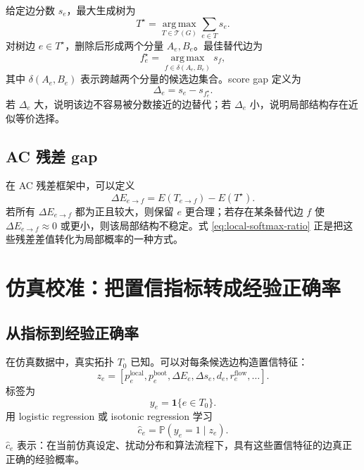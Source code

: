 \documentclass[UTF8,12pt,openany]{ctexrep}
\numberwithin{equation}{chapter}
\theoremstyle{definition}
\theoremstyle{plain}
\newcommand{\Prob}{\mathbb{P}}
\newcommand{\argmax}{\operatorname*{arg\,max}}
\newcommand{\ind}[1]{\mathbf{1}\{#1\}}
\newcommand{\Tcal}{\mathcal{T}}
\begin{document}
给定边分数 $s_e$，最大生成树为
\begin{equation}
T^\star=\argmax_{T\in\Tcal(G)}\sum_{e\in T}s_e.
\label{eq:maximum-spanning-tree}
\end{equation}
对树边 $e\in T^\star$，删除后形成两个分量 $A_e,B_e$。最佳替代边为
\begin{equation}
f_e^\star
=
\argmax_{f\in\delta(A_e,B_e)}s_f,
\label{eq:best-replacement-edge}
\end{equation}
其中 $\delta(A_e,B_e)$ 表示跨越两个分量的候选边集合。score gap 定义为
\begin{equation}
\Delta_e=s_e-s_{f_e^\star}.
\label{eq:score-gap}
\end{equation}
若 $\Delta_e$ 大，说明该边不容易被分数接近的边替代；若 $\Delta_e$ 小，说明局部结构存在近似等价选择。

\section{AC 残差 gap}

在 AC 残差框架中，可以定义
\begin{equation}
\Delta E_{e\to f}
=
E(T_{e\to f})-E(T^\star).
\label{eq:ac-gap}
\end{equation}
若所有 $\Delta E_{e\to f}$ 都为正且较大，则保留 $e$ 更合理；若存在某条替代边 $f$ 使 $\Delta E_{e\to f}\approx 0$ 或更小，则该局部结构不稳定。式 \eqref{eq:local-softmax-ratio} 正是把这些残差差值转化为局部概率的一种方式。

\chapter{仿真校准：把置信指标转成经验正确率}

\section{从指标到经验正确率}

在仿真数据中，真实拓扑 $T_0$ 已知。可以对每条候选边构造置信特征：
\begin{equation}
z_e=
\left[
p_e^{\mathrm{local}},
p_e^{\mathrm{boot}},
\Delta E_e,
\Delta s_e,
d_e,
r_e^{\mathrm{flow}},
\ldots
\right].
\label{eq:calibration-features}
\end{equation}
标签为
\begin{equation}
y_e=\ind{e\in T_0}.
\label{eq:calibration-label}
\end{equation}
用 logistic regression 或 isotonic regression 学习
\begin{equation}
\hat c_e=\Prob(y_e=1\mid z_e).
\label{eq:simulation-calibrated-correctness}
\end{equation}
$\hat c_e$ 表示：在当前仿真设定、扰动分布和算法流程下，具有这些置信特征的边真正正确的经验概率。
\end{document}
